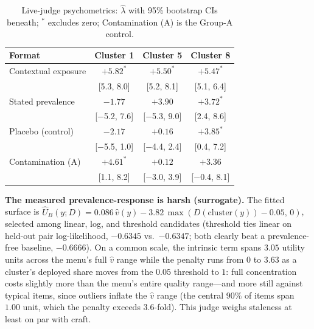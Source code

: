 ﻿\documentclass[11pt]{article}
\begin{document}
\begin{table}[t]
\centering
\footnotesize
\setlength{\tabcolsep}{3pt}
\begin{tabular}{@{}lccc@{}}
\toprule
Format & Cluster 1 & Cluster 5 & Cluster 8 \\
\midrule
Contextual exposure & $+5.82^{*}$ & $+5.50^{*}$ & $+5.47^{*}$ \\
 & [5.3, 8.0] & [5.2, 8.1] & [5.1, 6.4] \\
\addlinespace[2pt]
Stated prevalence & $-1.77$ & $+3.90$ & $+3.72^{*}$ \\
 & [$-$5.2, 7.6] & [$-$5.3, 9.0] & [2.4, 8.6] \\
\addlinespace[2pt]
Placebo (control) & $-2.17$ & $+0.16$ & $+3.85^{*}$ \\
 & [$-$5.5, 1.0] & [$-$4.4, 2.4] & [0.4, 7.2] \\
\addlinespace[2pt]
Contamination (A) & $+4.61^{*}$ & $+0.12$ & $+3.36$ \\
 & [1.1, 8.2] & [$-$3.0, 3.9] & [$-$0.4, 8.1] \\
\bottomrule
\end{tabular}
\caption{Live-judge psychometrics: \(\hat\lambda\) with 95\% bootstrap CIs beneath; $^{*}$ excludes zero; Contamination (A) is the Group-A control.}
\label{tab:live-psychometrics}
\end{table}

\textbf{The measured prevalence-response is harsh (surrogate).} The fitted surface is \(\hat U_B(y; D) = 0.086\,\hat v(y) - 3.82\,\max(D(\mathrm{cluster}(y)) - 0.05,\, 0)\), selected among linear, log, and threshold candidates (threshold ties linear on held-out pair log-likelihood, \(-0.6345\) vs.\ \(-0.6347\); both clearly beat a prevalence-free baseline, \(-0.6666\)). On a common scale, the intrinsic term spans \(3.05\) utility units across the menu's full \(\hat v\) range while the penalty runs from \(0\) to \(3.63\) as a cluster's deployed share moves from the \(0.05\) threshold to \(1\): full concentration costs slightly more than the menu's entire quality range---and more still against typical items, since outliers inflate the \(\hat v\) range (the central \(90\%\) of items span \(1.00\) unit, which the penalty exceeds \(3.6\)-fold). This judge weighs staleness at least on par with craft.
\end{document}

